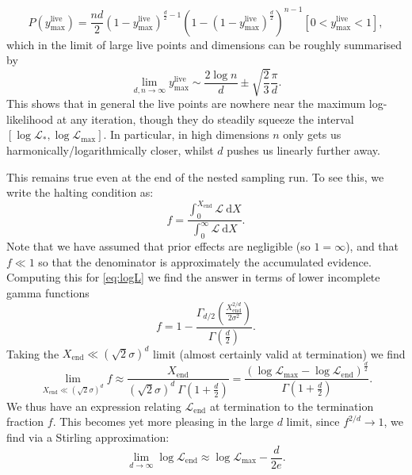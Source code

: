 \documentclass[usenatbib]{mnras}
\begin{document}
\begin{equation}
    P(y_\mathrm{max}^\mathrm{live}) = \frac{nd}{2}(1-y_\mathrm{max}^\mathrm{live})^{\frac{d}{2}-1}\left(1-(1-y_\mathrm{max}^\mathrm{live})^{\frac{d}{2}}\right)^{n-1}[0<y_\mathrm{max}^\mathrm{live}<1],
    \label{eq:Pyhat}
\end{equation}
which in the limit of large live points and dimensions can be roughly summarised by
\begin{equation}\label{eq:ylivemax}
	    \lim_{d,n\to\infty} y_\mathrm{max}^\mathrm{live} \sim \frac{2\log n}{d} \pm \sqrt{\frac{2}{3}}\frac{\pi}{d}.
\end{equation}
This shows that in general the live points are nowhere near the maximum log-likelihood at any iteration, though they do steadily squeeze the interval $[\log\mathcal{L}_*,\log\mathcal{L}_\mathrm{max}]$. In particular, in high dimensions $n$ only gets us harmonically/logarithmically closer, whilst $d$ pushes us linearly further away.
\par
This remains true even at the end of the nested sampling run. To see this, we write the halting condition as:
\begin{equation}
	f = \frac{\int_0^{X_\mathrm{end}} \mathcal{L}\ \mathrm{d}X}{\int_0^\infty \mathcal{L}\ \mathrm{d}X}.
    \label{eq:fint}
\end{equation}
Note that we have assumed that prior effects are negligible (so $1=\infty$), and that $f \ll 1$ so that the denominator is approximately the accumulated evidence. Computing this for \cref{eq:logL} we find the answer in terms of lower incomplete gamma functions
\begin{equation}
    f = 1- \frac{\Gamma_{d/2}\left(\frac{X_\mathrm{end}^{2/d}}{2\sigma^2}\right)}{\Gamma\left(\frac{d}{2}\right)}.
    \label{eq:f}
\end{equation}
Taking the $X_\mathrm{end}\ll (\sqrt{2}\sigma)^d$ limit (almost certainly valid at termination) we find
\begin{equation}
    \lim_{X_\mathrm{end}\ll (\sqrt{2}\sigma)^d} f \approx \frac{X_\mathrm{end}}{(\sqrt{2}\sigma)^d \ \Gamma(1+\frac{d}{2})} = \frac{(\log\mathcal{L}_\mathrm{max}-\log\mathcal{L}_\mathrm{end})^{\frac{d}{2}}}{\Gamma(1+\frac{d}{2})}.
\end{equation}
We thus have an expression relating $\mathcal{L}_\mathrm{end}$ at termination to the termination fraction $f$. This becomes yet more pleasing in the large $d$ limit, since $f^{2/d}\to 1$, we find via a Stirling approximation:
\begin{equation}
    \lim_{d\to\infty} \log\mathcal{L}_\mathrm{end} \approx \log\mathcal{L}_\mathrm{max} - \frac{d}{2e}.
\end{equation}
\end{document}

